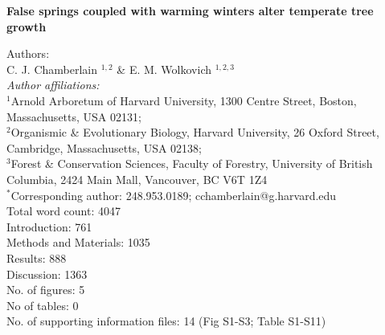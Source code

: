 \documentclass{article}\usepackage[]{graphicx}\usepackage[]{color}
\begin{document}
\noindent \textbf{\Large{False springs coupled with warming winters alter temperate tree growth}}


\noindent Authors:\\
C. J. Chamberlain $^{1,2}$ \& E. M. Wolkovich $^{1,2,3}$
\vspace{2ex}\\
\emph{Author affiliations:}\\
$^{1}$Arnold Arboretum of Harvard University, 1300 Centre Street, Boston, Massachusetts, USA 02131; \\
$^{2}$Organismic \& Evolutionary Biology, Harvard University, 26 Oxford Street, Cambridge, Massachusetts, USA 02138; \\
$^{3}$Forest \& Conservation Sciences, Faculty of Forestry, University of British Columbia, 2424 Main Mall, Vancouver, BC V6T 1Z4\\
\vspace{2ex}
$^*$Corresponding author: 248.953.0189; cchamberlain@g.harvard.edu\\


Total word count: 4047 \\
Introduction: 761 \\
Methods and Materials: 1035\\
Results: 888\\
Discussion: 1363 \\

No. of figures: 5\\
No of tables: 0 \\
No. of supporting information files: 14 (Fig S1-S3; Table S1-S11)\\ 

\renewcommand{\thetable}{\arabic{table}}
\renewcommand{\thefigure}{\arabic{figure}}
\renewcommand{\labelitemi}{$-$}

\end{document}
